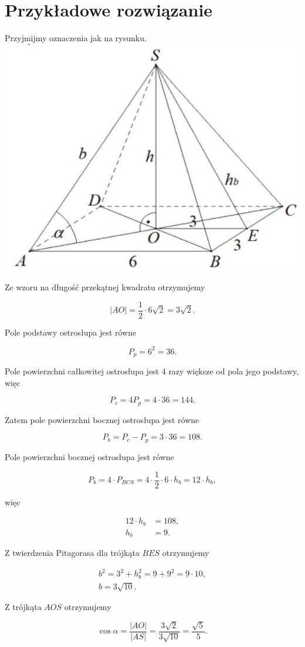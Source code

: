 \documentclass[10pt]{article}
\begin{document}
\section*{Przykładowe rozwiązanie}
Przyjmijmy oznaczenia jak na rysunku.\\
\includegraphics[max width=\textwidth, center]{2025_02_07_cbaae63d39acb23a5920g-31}

Ze wzoru na długość przekątnej kwadratu otrzymujemy

$$
|A O|=\frac{1}{2} \cdot 6 \sqrt{2}=3 \sqrt{2} .
$$

Pole podstawy ostrosłupa jest równe

$$
P_{p}=6^{2}=36 .
$$

Pole powierzchni całkowitej ostrosłupa jest 4 razy większe od pola jego podstawy, więc

$$
P_{c}=4 P_{p}=4 \cdot 36=144 .
$$

Zatem pole powierzchni bocznej ostrosłupa jest równe

$$
P_{b}=P_{c}-P_{p}=3 \cdot 36=108 .
$$

Pole powierzchni bocznej ostrosłupa jest równe

$$
P_{b}=4 \cdot P_{B C S}=4 \cdot \frac{1}{2} \cdot 6 \cdot h_{b}=12 \cdot h_{b},
$$

więc

$$
\begin{aligned}
12 \cdot h_{b} & =108, \\
h_{b} & =9 .
\end{aligned}
$$

Z twierdzenia Pitagorasa dla trójkąta $B E S$ otrzymujemy

$$
\begin{gathered}
b^{2}=3^{2}+h_{b}^{2}=9+9^{2}=9 \cdot 10, \\
b=3 \sqrt{10} .
\end{gathered}
$$

Z trójkąta $A O S$ otrzymujemy

$$
\cos \alpha=\frac{|A O|}{|A S|}=\frac{3 \sqrt{2}}{3 \sqrt{10}}=\frac{\sqrt{5}}{5} .
$$
\end{document}
